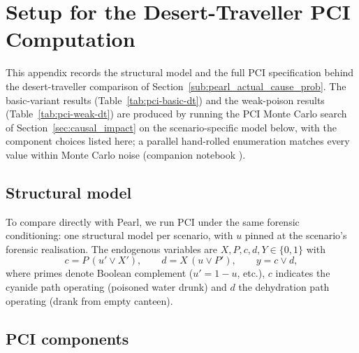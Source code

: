 \section{Setup for the Desert-Traveller PCI Computation}\label{app:desert}

This appendix records the structural model and the full PCI specification behind
the desert-traveller comparison of
Section~\ref{sub:pearl_actual_cause_prob}. The basic-variant results
(Table~\ref{tab:pci-basic-dt}) and the weak-poison results
(Table~\ref{tab:pci-weak-dt}) are produced by running the PCI Monte Carlo
search of Section~\ref{sec:causal_impact} on the scenario-specific model below,
with the component choices listed here; a parallel hand-rolled enumeration matches every
value within Monte Carlo noise (companion notebook
).

\subsection{Structural model}\label{app:desert_model}

To compare directly with Pearl, we run PCI under the same forensic
conditioning: one structural model per scenario, with $u$ pinned at the
scenario's forensic realisation. The endogenous variables are $X, P, c, d,
Y \in \{0,1\}$ with
\[
c = P\,(u' \vee X'), \qquad d = X\,(u \vee P'), \qquad y = c \vee d,
\]
where primes denote Boolean complement ($u'=1-u$, etc.), $c$ indicates the cyanide
path operating (poisoned water drunk) and $d$
the dehydration path operating (drank from empty canteen).

\subsection{PCI components}\label{app:desert_components}

